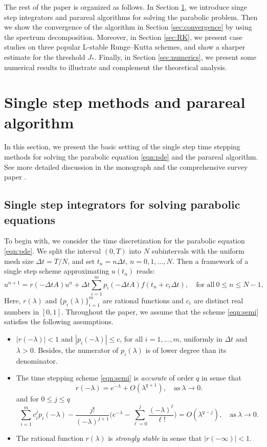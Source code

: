 The rest of the paper is organized as follows. In Section \ref{sec:parareal}, we introduce singe step integrators
and parareal algorithms for solving the parabolic problem.
Then we show the convergence of the algorithm in Section  \ref{sec:convergence}
by using the spectrum decomposition.
Moreover, in Section \ref{sec:RK}, we present case studies on three popular L-stable Runge--Kutta schemes, and show a sharper estimate for
the threshold $J_*$. Finally, in Section \ref{sec:numerics}, we present some numerical results to illustrate and complement the theoretical analysis.



\section{Single step methods and parareal algorithm}\label{sec:parareal}
In this section, we present the basic setting of the single step time stepping methods for solving the parabolic equation \eqref{eqn:pde}
and the parareal algorithm. See more detailed discussion in the monograph \cite[Chapter 7-9]{Thomee:2006}
and the comprehensive survey paper \cite{Gander:2015}.

\subsection{Single step integrators for solving parabolic equations}
To begin with, we consider the time discretization for the parabolic equation \eqref{eqn:pde}.
We split the interval $(0,T)$ into $N$ subintervals with the uniform mesh size ${\Delta t}=T/N$,
and set $t_n = n{\Delta t}$, $n=0,1,\ldots,N$.
Then a framework of a single step scheme approximating $u(t_n)$ reads:
\begin{equation}\label{eqn:semi}
  u^{n+1} = r(-{\Delta t} A) u^{n} + {\Delta t} \sum_{i=1}^m p_i(-{\Delta t} A)
  f(t_n+c_i\Delta t) ,\quad \text{for all}~0\le n\le N-1,
\end{equation}
Here, $r(\lambda)$ and $\{p_i(\lambda)\}^m_{i=1}$ are rational functions and $c_i$ are distinct real numbers in $[0,1]$.
Throughout the paper, we assume that the scheme \eqref{eqn:semi} satisfies the following assumptions.\vskip10pt

\begin{itemize}
\item[{\bf (P1)}] $| r (-\lambda)|< 1$ and $|p_i(-\lambda)|\le c$, for all $i=1,\ldots,m$,
uniformly in ${\Delta t}$ and $\lambda > 0$. Besides, the numerator of $p_i(\lambda)$
is of lower degree than its denominator.
\item[{\bf (P2)}] The time stepping scheme \eqref{eqn:semi}  is \textsl{accurate} of order $q$ in sense that
$$  r (-\lambda) = e^{-\lambda} + O(\lambda^{q+1}),\quad \text{as}~\lambda\rightarrow0. $$
and for $0\le j\le q$
$$ \sum_{i=1}^m c_i^j p_i(-\lambda) - \frac{j!}{(-\lambda)^{j+1}}\Big(e^{-\lambda}
- \sum_{\ell=0}^j \frac{(-\lambda)^\ell}{\ell!}\Big) = O(\lambda^{q-j}),\quad \text{as}~\lambda\rightarrow0. $$
\item[{\bf (P3)}] The rational function $r(\lambda)$ is \textsl{strongly stable} in sense that $|r(-\infty)|<1$.
\end{itemize}\vskip5pt

